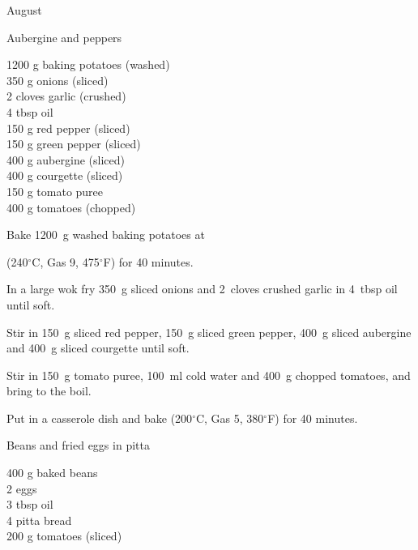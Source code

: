 \begin{menu}{August}
\begin{recipe}{2}{Aubergine and peppers}
		\begin{ingredients}
		1200 g baking potatoes (washed) \\
	350 g onions (sliced) \\
	2 cloves garlic (crushed) \\
	4 tbsp oil  \\
	150 g red pepper (sliced) \\
	150 g green pepper (sliced) \\
	400 g aubergine (sliced) \\
	400 g courgette (sliced) \\
	150 g tomato puree  \\
	400 g tomatoes (chopped) \\
	
		\end{ingredients}
	
    \begin{instructions}
    \item 
      Bake 1200~g washed baking potatoes
      at
      
      (240$^{\circ}$C, Gas 9, 475$^{\circ}$F)
     for 40 minutes.
    \item 
        In a large wok fry
        350~g sliced onions
        and
        2~cloves crushed garlic
        in
        4~tbsp  oil
        until soft.
      \item 
        Stir in
        150~g sliced red pepper,
        150~g sliced green pepper,
        400~g sliced aubergine
        and
        400~g sliced courgette
        until soft.
      \item 
        Stir in
        150~g  tomato puree,
        100~ml  cold water
        and
        400~g chopped tomatoes,
        and bring to the boil.
      \item 
        Put in a casserole dish and bake 
      (200$^{\circ}$C, Gas 5, 380$^{\circ}$F)
     for 40 minutes.
      
    \end{instructions}
    \end{recipe}%
  
    \begin{recipe}{1}{Beans and fried eggs in pitta}%
    
		\begin{ingredients}
		400 g baked beans  \\
	2  eggs  \\
	3 tbsp oil  \\
	4  pitta bread  \\
	200 g tomatoes (sliced) \\
	

\end{ingredients}
\end{recipe}
\end{menu}
